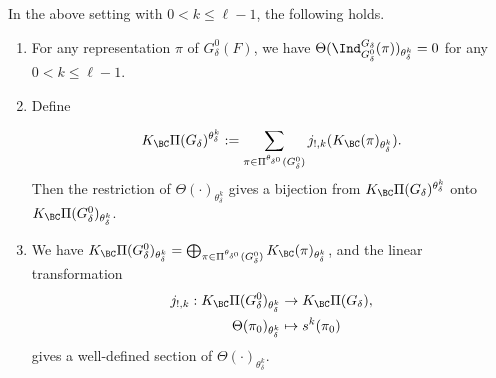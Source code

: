 \documentclass[11pt,letterpaper]{amsart}
\numberwithin{equation}{section}
\begin{document}
\begin{lemma}\label{lemma: extension by zero}
In the above setting with $0 <k \leq \ell-1$, the following holds. 
    \begin{enumerate}
    \item For any representation $\pi$ of $G^0_{\delta}(F)$, we have $\Theta(\Ind_{G^0_{\delta}}^{G_{\delta}}(\pi))_{\theta_\delta^{k}}=0$ for any $0<k\leq \ell-1.$
    
    \item Define 
        
\[
K_{\BC}\Pi(G_{\delta})^{\theta_\delta^k}:= \sum_{\pi \in \Pi^{\theta_{\delta^0}}(G^0_{\delta})} j_{!,k}(K_{\BC} (\pi)_{\theta_\delta^k}).
\]
        Then the restriction of $\Theta(\cdot)_{\theta_\delta^k}$ gives a bijection from $ K_{\BC}\Pi(G_{\delta})^{\theta_\delta^k}$ onto $K_{\BC}\Pi(G_{\delta}^0)_{\theta_\delta^k}$.
        
        \item  
        We have $K_{\BC}\Pi(G^0_{\delta})_{\theta_\delta^k}= \bigoplus_{\pi \in \Pi^{\theta_{\delta^0}}(G^0_{\delta})} K_{\BC}(\pi)_{\theta_\delta^k}$, and the linear transformation 
        \begin{align*}
            j_{!,k}: K_{\BC}\Pi(G^0_{\delta})_{\theta_\delta^k} &\to K_{\BC}\Pi(G_{\delta}),\\
            \Theta(\pi_0)_{\theta_\delta^k} &\mapsto s^k(\pi_0)
            \end{align*}  
        gives a well-defined section of $\Theta(\cdot)_{\theta_\delta^k}$. 
    \end{enumerate}
\end{lemma}
\end{document}
